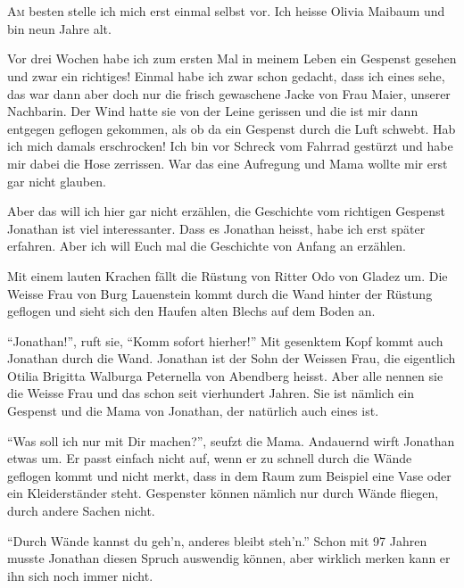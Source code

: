 \chapter*{}
\begin{mdframed}[style=mystyle]
\lettrine[lines=3]{\color{red}A}{m} besten stelle ich mich erst einmal selbst vor. Ich heisse Olivia Maibaum und bin neun Jahre alt. 

Vor drei Wochen habe ich zum ersten Mal in meinem Leben ein Gespenst gesehen und zwar ein richtiges! Einmal habe ich zwar schon gedacht, dass ich eines sehe, das war dann aber doch nur die frisch gewaschene Jacke von Frau Maier, unserer Nachbarin. Der Wind hatte sie von der Leine gerissen und die ist mir dann entgegen geflogen gekommen, als ob da ein Gespenst durch die Luft schwebt. Hab ich mich damals erschrocken! Ich bin vor Schreck vom Fahrrad gestürzt und habe mir dabei die Hose zerrissen.  War das eine Aufregung und Mama wollte mir erst gar nicht glauben.

Aber das will ich hier gar nicht erzählen, die Geschichte vom richtigen Gespenst Jonathan ist viel interessanter.  Dass es Jonathan heisst, habe ich erst später erfahren. Aber ich will Euch mal die Geschichte von Anfang an erzählen.
\end{mdframed}

Mit einem lauten Krachen fällt die Rüstung von Ritter Odo von Gladez um. Die Weisse Frau von Burg Lauenstein kommt durch die Wand hinter der Rüstung geflogen und sieht sich den Haufen alten Blechs auf dem Boden an.

\enquote{Jonathan!}, ruft sie, \enquote{Komm sofort hierher!} Mit gesenktem Kopf kommt auch Jonathan durch die Wand. Jonathan ist der Sohn der Weissen Frau, die eigentlich Otilia Brigitta Walburga Peternella von Abendberg heisst. Aber alle nennen sie die Weisse Frau und das schon seit vierhundert Jahren. Sie ist nämlich ein Gespenst und die Mama von Jonathan, der natürlich auch eines ist. 

\enquote{Was soll ich nur mit Dir machen?}, seufzt die Mama. Andauernd wirft Jonathan etwas um. Er passt einfach nicht auf, wenn er zu schnell durch die Wände geflogen kommt und nicht merkt, dass in dem Raum zum Beispiel eine Vase oder ein Kleiderständer steht. Gespenster können nämlich nur durch Wände fliegen, durch andere Sachen nicht. 

\enquote{Durch Wände kannst du geh'n, anderes bleibt steh'n.} Schon mit 97 Jahren musste Jonathan diesen Spruch auswendig können, aber wirklich merken kann er ihn sich noch immer nicht. 

